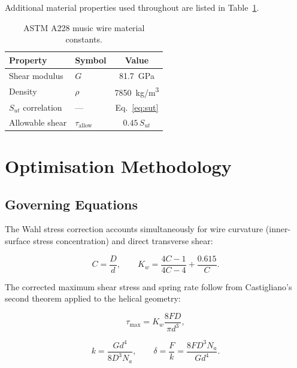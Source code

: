\documentclass[10pt,twocolumn]{article}
\begin{document}
Additional material properties used throughout are listed in
Table~\ref{tab:mat}.

\begin{table}[H]
  \centering
  \caption{ASTM A228 music wire material constants.}
  \label{tab:mat}
  \small
  \begin{tabular}{@{}llc@{}}
    \toprule
    Property & Symbol & Value \\
    \midrule
    Shear modulus  & $G$   & \SI{81.7}{GPa} \\
    Density        & $\rho$& \SI{7850}{kg/m^3} \\
    $S_{ut}$ correlation & ---  & Eq.~\eqref{eq:sut} \\
    Allowable shear & $\tau_{\text{allow}}$ & $0.45\,S_{\!ut}$ \\
    \bottomrule
  \end{tabular}
\end{table}

\section{Optimisation Methodology}

\subsection{Governing Equations}

The Wahl stress correction accounts simultaneously for wire curvature
(inner-surface stress concentration) and direct transverse shear:

\begin{equation}
  C = \frac{D}{d}, \qquad
  K_w = \frac{4C-1}{4C-4} + \frac{0.615}{C}.
  \label{eq:kw}
\end{equation}

The corrected maximum shear stress and spring rate follow from
Castigliano's second theorem applied to the helical geometry:

\begin{equation}
  \tau_{\max} = K_w \frac{8FD}{\pi d^3},
  \label{eq:tau}
\end{equation}

\begin{equation}
  k = \frac{G d^4}{8 D^3 N_a}, \qquad
  \delta = \frac{F}{k} = \frac{8 F D^3 N_a}{G d^4}.
  \label{eq:k}
\end{equation}
\end{document}
